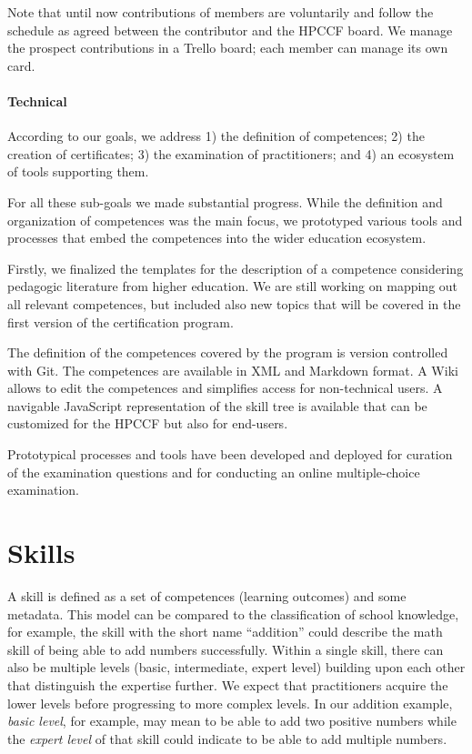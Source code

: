 \documentclass[jocse]{jocseart}
\begin{document}
Note that until now contributions of members are voluntarily and follow the schedule as agreed between the contributor and the HPCCF board.
We manage the prospect contributions in a Trello board; each member can manage its own card.

\paragraph{Technical}
According to our goals, we address 1) the definition of competences; 2) the creation of certificates; 3) the examination of practitioners; and 4) an ecosystem of tools supporting them.

For all these sub-goals we made substantial progress.
While the definition and organization of competences was the main focus, we prototyped various tools and processes that embed the competences into the wider education ecosystem.

Firstly, we finalized the templates for the description of a competence considering pedagogic literature from higher education.
We are still working on mapping out all relevant competences, but included also new topics that will be covered in the first version of the certification program.

The definition of the competences covered by the program is version controlled with Git.
The competences are available in XML and Markdown format.
A Wiki allows to edit the competences and simplifies access for non-technical users.
A navigable JavaScript representation of the skill tree is available that can be customized for the HPCCF but also for end-users.

Prototypical processes and tools have been developed and deployed for curation of the examination questions and for conducting an online multiple-choice examination.

\section{Skills}
\label{sec:skills}

A skill is defined as a set of competences (learning outcomes) and some metadata.
This model can be compared to the classification of school knowledge, for example, the skill with the short name “addition” could describe the math skill of being able to add numbers successfully.
Within a single skill, there can also be multiple levels (basic, intermediate, expert level) building upon each other that distinguish the expertise further.
We expect that practitioners acquire the lower levels before progressing to more complex levels.
In our addition example, \textit{basic level}, for example, may mean to be able to add two positive numbers while the \textit{expert level} of that skill could indicate to be able to add multiple numbers.
\end{document}
